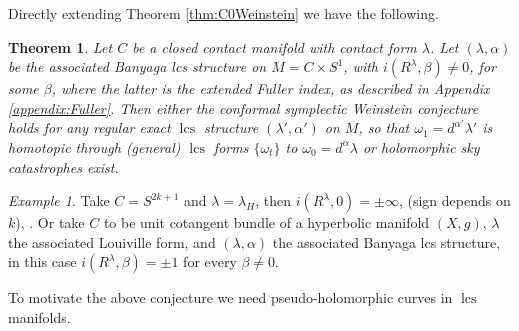 \documentclass{amsart}
\numberwithin{equation}{section}
\newtheorem{theorem}[equation]{Theorem}
\newtheorem{definition}[equation]{Definition}
\theoremstyle{definition}
\theoremstyle{remark}
\newtheorem{example}{Example}
\DeclareMathOperator{\lcs}{lcs}
\begin{document}
Directly extending Theorem \ref{thm:C0Weinstein} we have the following.
\begin{theorem} \label{thm:catastrophyCSW} Let $C$ be a closed contact manifold with contact form $\lambda$. Let  $(\lambda,\alpha)$ be the associated Banyaga lcs structure on $M = C \times S ^{1} $,  with $i (R ^{\lambda}, \beta) \neq 0$, for some $\beta$, where the latter is the extended  Fuller index, as described in Appendix \ref{appendix:Fuller}. 
Then  either the conformal symplectic Weinstein conjecture holds 
for any regular exact $\lcs$ structure $(\lambda',\alpha')$ on $M$, so that $\omega _{1} = d ^{\alpha'} \lambda' $ is homotopic through (general) $\lcs$ forms $\{\omega _{t} \}$ to $\omega _{0} = d ^{\alpha} \lambda  $ or holomorphic sky catastrophes exist. 
\end{theorem}
\begin{example} Take $C = S ^{2k+1} $ and $\lambda = \lambda _{H} $, then $i (R ^{\lambda}, 0) = \pm \infty$, (sign depends on $k$), \cite{citeSavelyevFuller}. Or take $C$ to be unit cotangent bundle of a hyperbolic manifold $(X,g)$, $\lambda $ the associated Louiville form, and $(\lambda, \alpha)$ the associated Banyaga lcs structure, in this case $i (R ^{\lambda}, \beta )=\pm 1$ for every $\beta \neq 0$.
\end{example}
To motivate the above conjecture we need pseudo-holomorphic curves in $\lcs$ manifolds.
\end{document}
